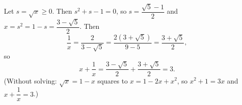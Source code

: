 Let $s=\sqrt x\ge0$. Then $s^2+s-1=0$, so $s=\dfrac{\sqrt5-1}{2}$ and $x=s^2=1-s=\dfrac{3-\sqrt5}{2}$. Then
\[
\dfrac{1}{x}=\dfrac{2}{3-\sqrt5}=\dfrac{2(3+\sqrt5)}{9-5}=\dfrac{3+\sqrt5}{2},
\]
so
\[
x+\dfrac{1}{x}=\dfrac{3-\sqrt5}{2}+\dfrac{3+\sqrt5}{2}=\boxed{3}.
\]
(Without solving: $\sqrt x=1-x$ squares to $x=1-2x+x^2$, so $x^2+1=3x$ and $x+\dfrac{1}{x}=3$.)
